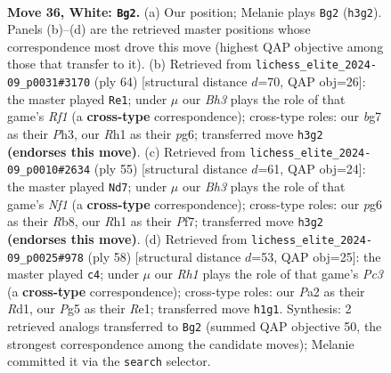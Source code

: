 \documentclass[11pt]{article}
\begin{document}
\clearpage

\begin{figure}[p]\centering
\begin{subfigure}{0.46\textwidth}\centering
\resizebox{\linewidth}{!}{%
\newchessgame
\chessboard[
  setfen={r5r1/5kbp/p1np2p1/4p1P1/1p2P2P/1P3PBB/P1PK4/R6R w - - 1 36},
  showmover=false,
  pgfstyle=straightmove, color=movearrow, markmove={h3-g2}
]}
\caption{}
\end{subfigure}\hfill
\begin{subfigure}{0.46\textwidth}\centering
\resizebox{\linewidth}{!}{%
\newchessgame
\chessboard[
  setfen={3r1k2/1b2r3/p5p1/P3pp1p/2Bp4/3P1P1P/1PPR2P1/5RK1 w - - 0 33},
  showmover=false,
  pgfstyle=straightmove, color=movearrow, markmove={f1-e1}
]}
\caption{}
\end{subfigure}
\\[4pt]
\begin{subfigure}{0.46\textwidth}\centering
\resizebox{\linewidth}{!}{%
\newchessgame
\chessboard[
  setfen={rr3nk1/5p2/p2p1bp1/2pPp3/N1P1P3/5P2/1P1B1K1R/3B3R b - - 0 28},
  showmover=false,
  pgfstyle=straightmove, color=movearrow, markmove={f8-d7}
]}
\caption{}
\end{subfigure}\hfill
\begin{subfigure}{0.46\textwidth}\centering
\resizebox{\linewidth}{!}{%
\newchessgame
\chessboard[
  setfen={4r3/5kp1/4p3/2pp1r1p/p6P/PnPPB1P1/5PK1/3RR3 w - - 2 30},
  showmover=false,
  pgfstyle=straightmove, color=movearrow, markmove={c3-c4}
]}
\caption{}
\end{subfigure}
\caption{\textbf{Move 36, White: \texttt{Bg2}.} (a) Our position; Melanie plays \texttt{Bg2} (\texttt{h3g2}). Panels (b)--(d) are the retrieved master positions whose correspondence most drove this move (highest QAP objective among those that transfer to it). (b) Retrieved from \texttt{lichess\_elite\_2024-09\_p0031\#3170} (ply 64) [structural distance $d$=70, QAP obj=26]: the master played \texttt{Re1}; under $\mu$ our \emph{Bh3} plays the role of that game's \emph{Rf1} (a \textbf{cross-type} correspondence); cross-type roles: our \emph{b}g7 as their \emph{P}h3, our \emph{R}h1 as their \emph{p}g6; transferred move \texttt{h3g2} \textbf{(endorses this move)}. (c) Retrieved from \texttt{lichess\_elite\_2024-09\_p0010\#2634} (ply 55) [structural distance $d$=61, QAP obj=24]: the master played \texttt{Nd7}; under $\mu$ our \emph{Bh3} plays the role of that game's \emph{Nf1} (a \textbf{cross-type} correspondence); cross-type roles: our \emph{p}g6 as their \emph{R}b8, our \emph{R}h1 as their \emph{P}f7; transferred move \texttt{h3g2} \textbf{(endorses this move)}. (d) Retrieved from \texttt{lichess\_elite\_2024-09\_p0025\#978} (ply 58) [structural distance $d$=53, QAP obj=25]: the master played \texttt{c4}; under $\mu$ our \emph{Rh1} plays the role of that game's \emph{Pc3} (a \textbf{cross-type} correspondence); cross-type roles: our \emph{P}a2 as their \emph{R}d1, our \emph{P}g5 as their \emph{R}e1; transferred move \texttt{h1g1}. Synthesis: 2 retrieved analogs transferred to \texttt{Bg2} (summed QAP objective 50, the strongest correspondence among the candidate moves); Melanie committed it via the \texttt{search} selector.}
\label{fig:thought-m70}
\end{figure}
\end{document}
